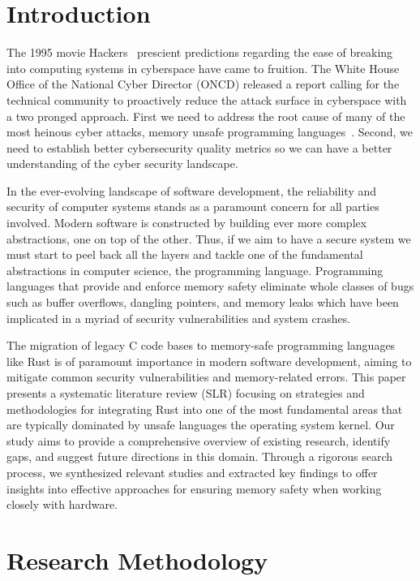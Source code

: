 \documentclass[sigconf]{acmart}
\begin{document}
\section{Introduction}

The 1995 movie Hackers~\cite{Wikipedia_contributors2024-zr} prescient predictions regarding the ease of breaking into computing systems in cyberspace have came to fruition. The White House Office of the National Cyber Director (ONCD) released a report calling for the technical community to proactively reduce the attack surface in cyberspace with a two pronged approach. First we need to address the root cause of many of the most heinous cyber attacks, memory unsafe programming languages~\cite{United_States_Gov2024-pp}. Second, we need to establish better cybersecurity quality metrics so we can have a better understanding of the cyber security landscape.

In the ever-evolving landscape of software development, the reliability and security of computer systems stands as a paramount concern for all parties involved. Modern software is constructed by building ever more complex abstractions, one on top of the other. Thus, if we aim to have a secure system we must start to peel back all the layers and tackle one of the fundamental abstractions in computer science, the programming language. Programming languages that provide and enforce memory safety eliminate whole classes of bugs such as buffer overflows, dangling pointers, and memory leaks which have been implicated in a myriad of security vulnerabilities and system crashes.

The migration of legacy C code bases to memory-safe programming languages like Rust is of paramount importance in modern software development, aiming to mitigate common security vulnerabilities and memory-related errors. This paper presents a systematic literature review (SLR) focusing on strategies and methodologies for integrating Rust into one of the most fundamental areas that are typically dominated by unsafe languages the operating system kernel. Our study aims to provide a comprehensive overview of existing research, identify gaps, and suggest future directions in this domain. Through a rigorous search process, we synthesized relevant studies and extracted key findings to offer insights into effective approaches for ensuring memory safety when working closely with hardware.

\section{Research Methodology}
\end{document}
